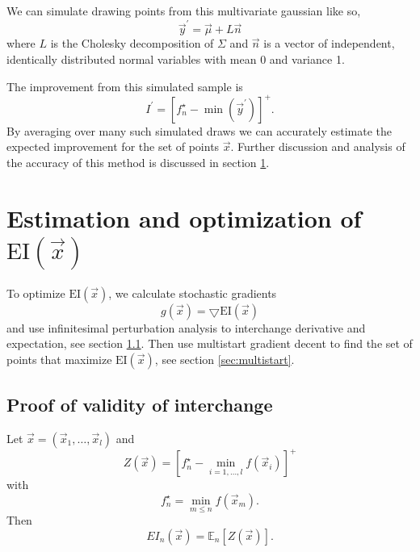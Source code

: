 \documentclass[phd,tocprelim]{cornell}
\begin{document}
We can simulate drawing points from this multivariate gaussian like so,
\begin{equation}
    \vec{y}^{\prime} = \vec{\mu} + L \vec{n}
\end{equation}
where $L$ is the Cholesky decomposition of $\Sigma$ and $\vec{n}$ is a vector of independent, identically distributed normal variables with mean 0 and variance 1.

The improvement from this simulated sample is
\begin{equation}
    I^{\prime} = \left[f_{n}^{\star} - \min(\vec{y}^{\prime})\right]^{+}.
\end{equation}
By averaging over many such simulated draws we can accurately estimate the expected improvement for the set of points $\vec{x}$. Further discussion and analysis of the accuracy of this method is discussed in section \ref{}.


\section{Estimation and optimization of $\mbox{EI}(\vec{x})$}

To optimize $\mbox{EI}(\vec{x})$, we calculate stochastic gradients
\begin{equation}
 g(\vec{x}) = \bigtriangledown \mbox{EI}(\vec{x})
\end{equation}
and use infinitesimal perturbation analysis \cite{Fu1994} to interchange derivative and expectation, see section \ref{EPI_proof}. Then use multistart gradient decent to find the set of points that maximize $\mbox{EI}(\vec{x})$, see section \ref{sec:multistart}.

\subsection{Proof of validity of interchange}
\label{EPI_proof}

Let $\vec{x} = \left(\vec{x}_{1}, \ldots, \vec{x}_{l}\right)$ and
\begin{equation}
    Z \left(\vec{x}\right) = \left[f_{n}^{\star} - \min_{i = 1,\ldots,l} f \left(\vec{x}_{i}\right)\right]^{+}
\end{equation}
with
\begin{equation}
    f_{n}^{\star} = \min_{m\leq n} f \left(\vec{x}_{m}\right).
\end{equation}
Then
\begin{equation}
    EI_{n}(\vec{x}) = \mathbb{E}_{n}\left[Z \left(\vec{x}\right)\right].
\end{equation}
\end{document}
